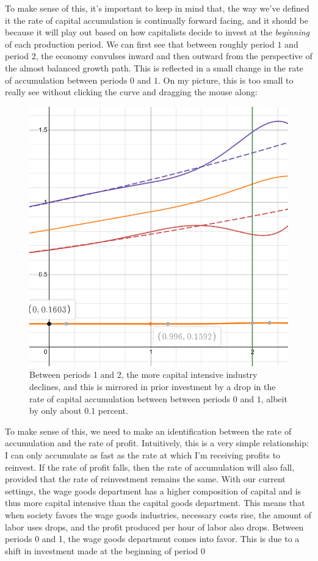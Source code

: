 \documentclass{article}
\theoremstyle{theorem}
\begin{document}
To make sense of this, it's important to keep in mind that, the way we've defined it the rate of capital accumulation is continually forward facing, and it should be because it will play out based on how capitalists decide to invest at the \emph{beginning} of each production period. We can first see that between roughly period $1$ and period $2$, the economy convulses inward and then outward from the perspective of the almost balanced growth path. This is reflected in a small change in the rate of accumulation between periods $0$ and $1$. On my picture, this is too small to really see without clicking the curve and dragging the mouse along:
\begin{figure}[H]
\centering
\includegraphics[scale=.7]{Images/dropInAccumulation}
\caption{Between periods 1 and 2, the more capital intensive industry declines, and this is mirrored in prior investment by a drop in the rate of capital accumulation between between periods $0$ and $1$, albeit by only about $0.1$ percent.}
\end{figure}
To make sense of this, we need to make an identification between the rate of accumulation and the rate of profit. Intuitively, this is a very simple relationship: I can only accumulate as fast as the rate at which I'm receiving profits to reinvest. If the rate of profit falls, then the rate of accumulation will also fall, provided that the rate of reinvestment remains the same. With our current settings, the wage goods department has a higher composition of capital and is thus more capital intensive than the capital goods department. This means that when society favors the wage goods industries, necessary costs rise, the amount of labor uses drops, and the profit produced per hour of labor also drops. Between periods 0 and 1, the wage goods department comes into favor. This is due to a shift in investment made at the beginning of period 0
\end{document}
